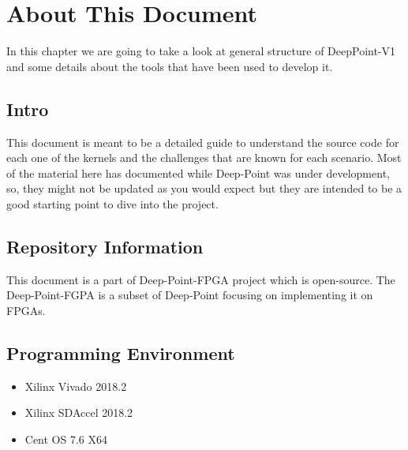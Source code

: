 \chapter{About This Document}
In this chapter we are going to take a look at general structure of DeepPoint-V1 and some details about the tools that have been used to develop it.
\section{Intro}
This document is meant to be a detailed guide to understand the source code for each one of the kernels and the challenges that are known for each scenario.
Most of the material here has documented while Deep-Point was under development, so, they might not be updated as you would expect but they are intended to be a good starting point to dive into the project.

\section{Repository Information}
This document is a part of Deep-Point-FPGA project which is open-source. The Deep-Point-FGPA is a subset of Deep-Point focusing on implementing it on FPGAs.

\section{Programming Environment}
\begin{itemize}
\item Xilinx Vivado 2018.2
\item Xilinx SDAccel 2018.2
\item Cent OS 7.6 X64
\end{itemize}